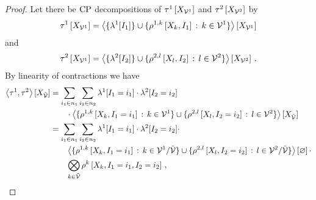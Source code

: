\begin{proof}
    Let there be $\mathrm{CP}$ decompositions of $\tau^{1}\left[X_{\mathcal{V}^{1}}\right]$ and $\tau^{2}\left[X_{\mathcal{V}^{2}}\right]$ by
    \begin{align*}
        \tau^{1}\left[X_{\mathcal{V}^{1}}\right]
        = \left\langle \{\lambda^{1}[I_{1}]\}\cup\{\rho^{1,k}\left[X_{k},I_{1}\right] \,:\, k\in\mathcal{V}^{1}\}\right\rangle \left[ X_{\mathcal{V}^{1}} \right]
    \end{align*}
    and
    \begin{align*}
        \tau^{2}\left[X_{\mathcal{V}^{1}}\right]
        = \left\langle \{\lambda^{2}[I_{2}]\}\cup\{\rho^{2,l}\left[X_{l},I_{2}\right] \,:\, l\in\mathcal{V}^{2}\}\right\rangle \left[ X_{\mathcal{V}^{2}} \right] \, .
    \end{align*}
    By linearity of contractions we have
    \begin{align*}
        \left\langle \tau^{1},\tau^{2}\right\rangle \left[ X_{\tilde{\mathcal{V}}} \right]
        &= \sum_{i_{1}\in n_{1}} \sum_{i_{2}\in n_{2}}
        \lambda^{1}[I_{1}=i_{1}] \cdot \lambda^{2}[I_{2}=i_{2}] \\
        & \quad\quad \cdot \left\langle \{\rho^{1,k}\left[X_{k},I_{1}=i_{1}\right] \,:\, k\in\mathcal{V}^{1}\} \cup \{\rho^{2,l}\left[X_{l},I_{2}=i_{2}\right] \,:\, l\in\mathcal{V}^{2}\}\right\rangle \left[ X_{\tilde{\mathcal{V}}} \right] \\
        &= \sum_{i_{1}\in n_{1}} \sum_{i_{2}\in n_{2}}
        \lambda^{1}[I_{1}=i_{1}] \cdot \lambda^{2}[I_{2}=i_{2}] \cdot \\
        & \quad\quad \left\langle \{\rho^{1,k}\left[X_{k},I_{1}=i_{1}\right] \,:\, k\in\mathcal{V}^{1}/\tilde{\mathcal{V}}\} \cup \{\rho^{2,l}\left[X_{l},I_{2}=i_{2}\right] \,:\, l\in\mathcal{V}^{2}/\tilde{\mathcal{V}}\}\right\rangle \left[ \varnothing \right] \cdot \\
        & \quad\quad \bigotimes_{k\in\tilde{\mathcal{V}}} \rho^{k}\left[X_{k},I_{1}=i_{1},I_{2}=i_{2}\right] \, ,
    \end{align*}

\end{proof}
